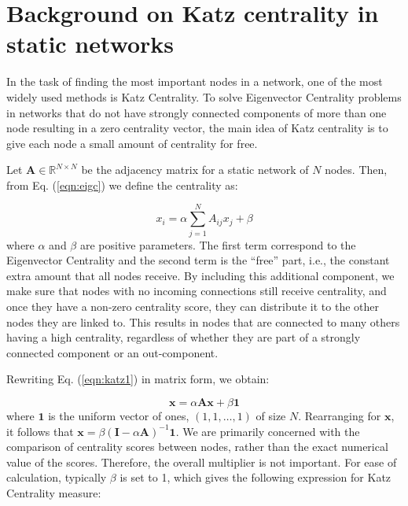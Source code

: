 \section{Background on Katz centrality in static networks}
\label{sec:back}
In the task of finding the most important nodes in a network, one of the most widely used methods is Katz Centrality. To solve Eigenvector Centrality problems in networks that do not have strongly connected components of more than one node resulting in a zero centrality vector, the main idea of Katz centrality is to give each node a small amount of centrality for free.

Let $\mathbf{A}\in\mathbb{R}^{N\times N}$ be the adjacency matrix for a static network of $N$ nodes. Then, from Eq. (\ref{eqn:eigc}) we define the centrality as:

\begin{equation}
\label{eqn:katz1}
    x_i= \alpha\sum_{j=1}^{N}A_{ij}x_j + \beta
\end{equation}
where $\alpha$ and $\beta$ are positive parameters. The first term correspond to the Eigenvector Centrality and the second term is the “free” part, i.e., the constant extra amount that all nodes receive. By including this additional component, we make sure that nodes with no incoming connections still receive centrality, and once they have a non-zero centrality score, they can distribute it to the other nodes they are linked to. This results in nodes that are connected to many others having a high centrality, regardless of whether they are part of a strongly connected component or an out-component.


Rewriting Eq. (\ref{eqn:katz1}) in matrix form, we obtain:

\begin{equation}
\label{eqn:katz2}
    \mathbf{x}= \alpha\mathbf{Ax} + \beta\mathbf{1}
\end{equation}
where $\mathbf{1}$ is the uniform vector of ones, $(1,1,\dots,1)$ of size $N$. Rearranging for $\mathbf{x}$, it follows that $\mathbf{x} = \beta (\mathbf{I}-\alpha\mathbf{A})^{-1}\mathbf{1}$.
We are primarily concerned with the comparison of centrality scores between nodes, rather than the exact numerical value of the scores. Therefore, the overall multiplier is not important. For ease of calculation, typically $\beta$ is set to 1, which gives the following expression for Katz Centrality measure:

